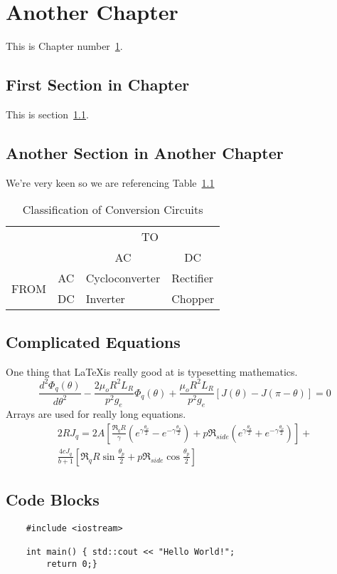 \chapter{Another Chapter}\label{chap:another}

This is Chapter number~\ref{chap:another}.


\section{First Section in Chapter}\label{another:sec}

This is section~\ref{another:sec}.

\section{Another Section in Another Chapter}

We're very keen so we are referencing Table~\ref{conversion}

\begin{table}[!h]
\centering
\begin{tabular}{l|l|l|l|}
\multicolumn{1}{l}{}&\multicolumn{1}{l}{}&\multicolumn{2}{c}{TO}\\ 
\cline{3-4}
\multicolumn{1}{l}{}&\multicolumn{1}{c|}{}&\multicolumn{1}{c|}{AC}&\multicolumn{1}{c|}{DC}\\ 
\cline{2-4}
\multirow{2}{*}{FROM}&\multicolumn{1}{c|}{AC}&Cycloconverter&Rectifier\\ 
&\multicolumn{1}{c|}{DC}&Inverter&Chopper\\ 
\cline{2-4}
\end{tabular}
\caption[Caption for List of Tables]{Classification of Conversion Circuits}
\label{conversion}
\end{table}

\section{Complicated Equations}

One thing that \LaTeX is really good at is typesetting mathematics.
\begin{equation}
\frac{d^2 \Phi_q(\theta)}{d\theta^2}-\frac{2\mu_o R^2 L_R}{p^2 g_e}\Phi_q(\theta)
+\frac{\mu_o R^2 L_R}{p^2 g_e} \left[J(\theta)-J(\pi-\theta)\right]=0
\label{aeqn:mm16}
\end{equation}
Arrays are used for really long equations.
\begin{eqnarray}
2RJ_q=2A\left[\frac{\Re_qR}{\gamma}(e^{\gamma\frac{\theta_p}{2}}-e^{-\gamma\frac{\theta_p}{2}})
+p\Re_{side}(e^{\gamma\frac{\theta_p}{2}}+e^{-\gamma\frac{\theta_p}{2}})\right]+
\nonumber\\
\frac{4cJ_q}{b+1}\left[\Re_qR\sin\frac{\theta_p}{2}+p\Re_{side}\cos\frac{\theta_p}{2}\right]
\end{eqnarray}

\section{Code Blocks}

\begin{lstlisting}
    #include <iostream>
    
    int main() { std::cout << "Hello World!";
        return 0;}
    
\end{lstlisting}
